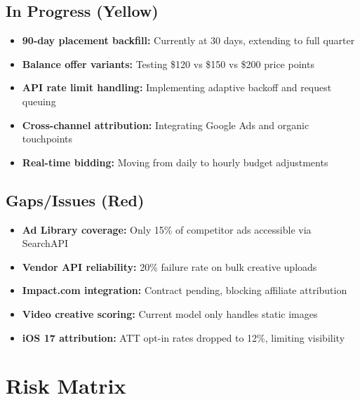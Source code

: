 \documentclass[11pt,a4paper]{report}
\newcommand{\statusyellow}[1]{\textcolor{aelpyellow}{\textbf{#1}}}
\newcommand{\statusred}[1]{\textcolor{aelpred}{\textbf{#1}}}
\begin{document}
\section{\statusyellow{In Progress (Yellow)}}
\begin{itemize}
    \item \textbf{90-day placement backfill:} Currently at 30 days, extending to full quarter
    \item \textbf{Balance offer variants:} Testing \$120 vs \$150 vs \$200 price points
    \item \textbf{API rate limit handling:} Implementing adaptive backoff and request queuing
    \item \textbf{Cross-channel attribution:} Integrating Google Ads and organic touchpoints
    \item \textbf{Real-time bidding:} Moving from daily to hourly budget adjustments
\end{itemize}

\section{\statusred{Gaps/Issues (Red)}}
\begin{itemize}
    \item \textbf{Ad Library coverage:} Only 15\% of competitor ads accessible via SearchAPI
    \item \textbf{Vendor API reliability:} 20\% failure rate on bulk creative uploads
    \item \textbf{Impact.com integration:} Contract pending, blocking affiliate attribution
    \item \textbf{Video creative scoring:} Current model only handles static images
    \item \textbf{iOS 17 attribution:} ATT opt-in rates dropped to 12\%, limiting visibility
\end{itemize}

\chapter{Risk Matrix}
\end{document}
